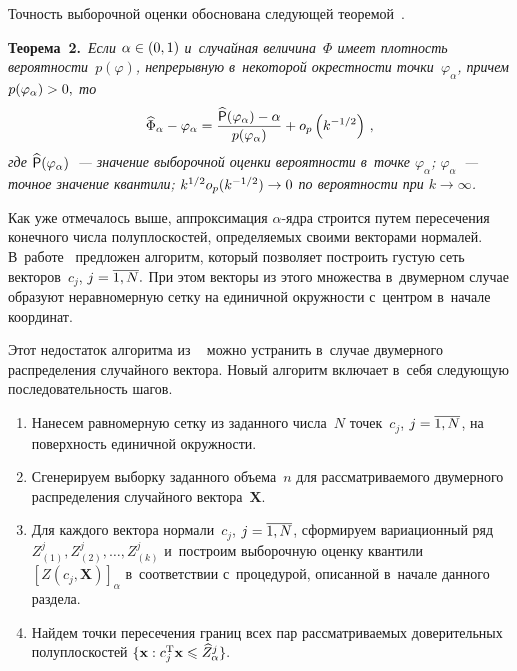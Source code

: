 \begin{multicols}{2}
Точность выборочной оценки обоснована сле\-ду\-ющей тео\-ре\-мой~\cite{bakh}.

\smallskip

\noindent
\textbf{Теорема~2.}\ 
\textit{Если $\alpha\hm\in (0,1)$ и~случайная величина~$\Phi$  
имеет плот\-ность ве\-ро\-ят\-ности~$p(\varphi)$, непрерывную в~некоторой окрест\-ности 
точ\-ки~$\varphi_\alpha$, причем $ p(\varphi_\alpha)\hm>0,$ то}
\begin{equation*}
\widehat \Phi_\alpha-\varphi_\alpha=
\displaystyle\frac{\displaystyle \widehat {\sf P}(\varphi_\alpha)-\alpha\mathstrut}{\displaystyle p(\varphi_\alpha)\mathstrut}+o_p\left(k^{-1/2}\right)\,,
\end{equation*}
\textit{где $\widehat {\sf P}(\varphi_\alpha)$~--- 
значение выборочной оценки ве\-ро\-ят\-ности в~точ\-ке $\varphi_\alpha$;
 $\varphi_\alpha$~--- 
точ\-ное значение квантили; $k^{1/2}o_p(k^{-1/2})\hm\to 0$ по ве\-ро\-ят\-ности при
 $k\to \infty$.}
 
 \smallskip

Как уже отмечалось выше, аппроксимация \mbox{$\alpha$-яд}\-ра строится путем 
пересечения конечного чис\-ла по\-лу\-плос\-костей,
определяемых своими векторами нормалей. В~работе~\cite{vaskan} пред\-ло\-жен 
алгоритм, который
 позволяет построить гус\-тую сеть векторов~$c_j$, $j\hm=\overline{1,N}.$ 
 При этом векторы из этого множества в~двумерном случае
 образуют неравномерную сет\-ку на единичной окруж\-ности 
 с~центром в~начале координат.

Этот недостаток алгоритма из ~\cite{vaskan} можно устранить в~случае 
двумерного распределения случайного вектора. Новый алгоритм включает в~себя 
сле\-ду\-ющую по\-сле\-до\-ва\-тель\-ность шагов.
\begin{enumerate}[1.]
\item  Нанесем равномерную сетку из заданного чис\-ла~$N$ точек~$c_j$, $j\hm=\overline{1,N}$, 
на по\-верх\-ность единичной окруж\-ности.


\item  Сгенерируем выборку заданного объема~$n$ 
для рас\-смат\-ри\-ва\-емо\-го двумерного распределения случайного вектора~$\mathbf{X}.$

\item  Для каждого вектора нормали~$c_j$,  $j\hm=\overline{1,N}$, сформируем 
вариационный ряд $Z_{(1)}^j, Z_{(2)}^j, \ldots, Z_{(k)}^j$
и~построим выборочную оценку квантили~$[Z(c_j,\mathbf X)]_\alpha$
в~соответствии с~процедурой, описанной в~начале данного раздела.

\item  Найдем точки пересечения границ всех пар рас\-смат\-ри\-ва\-емых доверительных 
полуплоскостей $\{ \mathbf {x}: c_j^{\mathrm{T}} \mathbf {x} \hm\leqslant  
\widehat  {Z}^j_\alpha\}.$


\end{enumerate}
\end{multicols}
